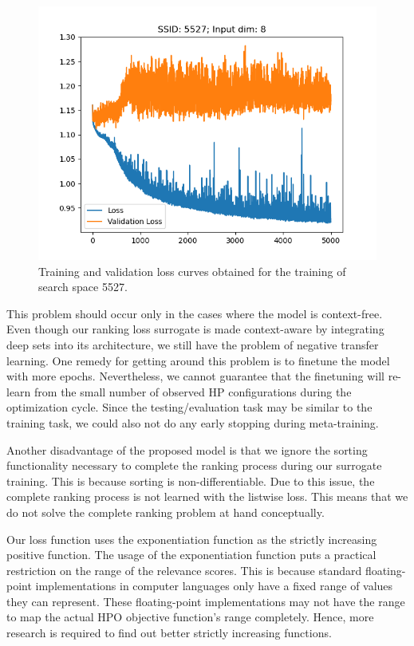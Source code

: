 \documentclass[12pt, twoside, ngerman]{report}
\begin{document}
\begin{figure}[htb]
  \centering
    \includegraphics[scale=0.5]{images/NegativeLearning}
    \caption{Training and validation loss curves obtained for the training of search space 5527.}
    \label{fig:NegativeLearning}
\end{figure}

This problem should occur only in the cases where the model is context-free.
Even though our ranking loss surrogate is made context-aware by integrating deep sets into its architecture, we still have the problem of negative transfer learning.
One remedy for getting around this problem is to finetune the model with more epochs.
Nevertheless, we cannot guarantee that the finetuning will re-learn from the small number of observed HP configurations during the optimization cycle.
Since the testing/evaluation task may be similar to the training task, we could also not do any early stopping during meta-training.

Another disadvantage of the proposed model is that we ignore the sorting functionality necessary to complete the ranking process during our surrogate training. This is because sorting is non-differentiable.
Due to this issue, the complete ranking process is not learned with the listwise loss. This means that we do not solve the complete ranking problem at hand conceptually.

Our loss function uses the exponentiation function as the strictly increasing positive function.
The usage of the exponentiation function puts a practical restriction on the range of the relevance scores. This is because standard floating-point implementations in computer languages only have a fixed range of values they can represent.
These floating-point implementations may not have the range to map the actual HPO objective function's range completely.
Hence, more research is required to find out better strictly increasing functions.
\end{document}
